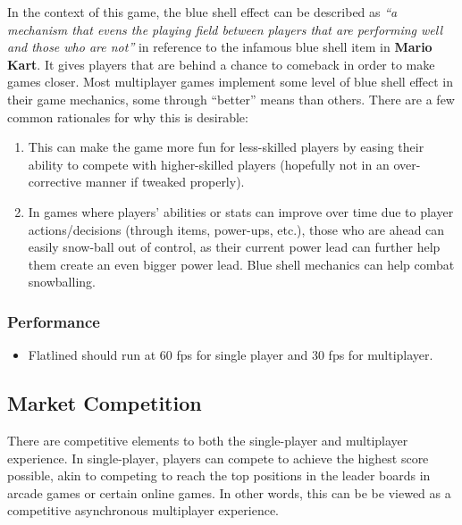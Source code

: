 \documentclass{article}
\newcommand{\name}{Flatlined}
\theoremstyle{definition}
\begin{document}
In the context of this game, the blue shell effect can be described as
\textit{``a mechanism that evens the playing field between players that are
performing well and those who are not''} in reference to the infamous blue
shell item in \textbf{Mario Kart}. It gives players that are behind a chance to
comeback in order to make games closer. Most multiplayer games implement some
level of blue shell effect in their game mechanics, some through ``better''
means than others. There are a few common rationales for why this is desirable:
\begin{enumerate}
  \item This can make the game more fun for less-skilled players by
    easing their ability to compete with higher-skilled players (hopefully not
    in an over-corrective manner if tweaked properly).
  \item In games where players' abilities or stats can improve over time due to
    player actions/decisions (through items, power-ups, etc.), those who are
    ahead can easily snow-ball out of control, as their current power lead can
    further help them create an even bigger power lead. Blue shell mechanics
    can help combat snowballing.
\end{enumerate}


\subsubsection{Performance}

\begin{itemize}
  \item \name{} should run at 60 fps for single player and 30 fps for
    multiplayer.
\end{itemize}


\subsection{Market Competition}

There are competitive elements to both the single-player and multiplayer
experience. In single-player, players can compete to achieve the highest score
possible, akin to competing to reach the top positions in the leader boards
in arcade games or certain online games. In other words, this can be be viewed
as a competitive asynchronous multiplayer experience.
\end{document}
